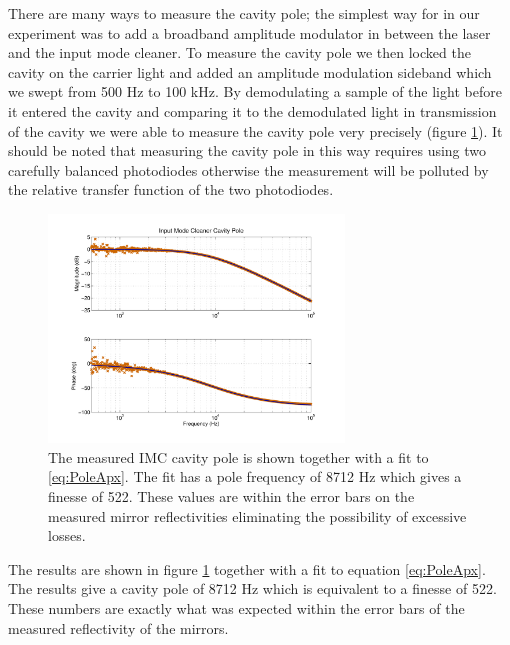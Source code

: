 There are many ways to measure the cavity pole; 
the simplest way for in our experiment was to add a broadband amplitude modulator in between the laser 
and the input mode cleaner.  
To measure the cavity pole we then locked the cavity on the carrier light and added 
an amplitude modulation sideband which we swept from 500 Hz to 100 kHz.  
By demodulating a sample of the light before it entered the cavity and comparing 
it to the demodulated light in transmission of the cavity we were able to 
measure the cavity pole very precisely (figure \ref{fig:cavPole}).  
It should be noted that measuring the cavity pole in this way requires using two 
carefully balanced photodiodes otherwise the measurement will be polluted by the 
relative transfer function of the two photodiodes.

\begin{figure}[ht]
	\centering
	\includegraphics[width = 0.7\textwidth, trim = 2.5cm 1.5cm 2.5cm 1cm]{Cavity_Pole.pdf}
	\caption{The measured IMC cavity pole is shown together with a fit 
		to \eqref{eq:PoleApx}.  The fit has a pole frequency of 8712 Hz 
		which gives a finesse of 522.  These values are within the error 
		bars on the measured mirror reflectivities eliminating the 
		possibility of excessive losses.}
	\label{fig:cavPole}
\end{figure}

The results are shown in figure \ref{fig:cavPole} together with a fit to equation 
\eqref{eq:PoleApx}.  The results give a cavity pole of 8712 Hz which is equivalent 
to a finesse of 522.  
These numbers are exactly what was expected within the error bars of the measured 
reflectivity of the mirrors.  

